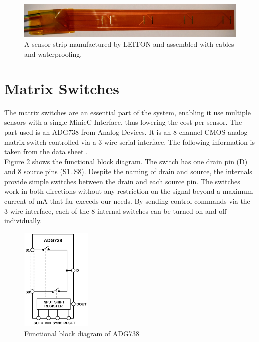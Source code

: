 \begin{figure}
	\begin{center}
		\includegraphics[width=\textwidth]{images/fpcbp.jpg} 
		\caption{A sensor strip manufactured by LEITON and assembled with cables and waterproofing.}
		\label{fig:fpcbp}
	\end{center}
\end{figure}

\section{Matrix Switches}

The matrix switches are an essential part of the system, enabling it use multiple sensors with a single MinieC Interface, thus lowering the cost per sensor. The part used is an ADG738 from Analog Devices. It is an 8-channel CMOS analog matrix switch controlled via a 3-wire serial interface. The following information is taken from the data sheet \cite{ms}.\\

Figure \ref{fig:ms} shows the functional block diagram. The switch has one drain pin (D) and 8 source pins (S1..S8). Despite the naming of drain and source, the internals provide simple switches between the drain and each source pin. The switches work in both directions without any restriction on the signal beyond a maximum current of \unit[120]{mA} that far exceeds our needs. By sending control commands via the 3-wire interface, each of the 8 internal switches can be turned on and off individually.\\

\begin{figure}
	\begin{center}
		\includegraphics[width=0.3\textwidth]{images/ms.pdf} 
		\caption{Functional block diagram of ADG738}
		\label{fig:ms}
	\end{center}
\end{figure}

